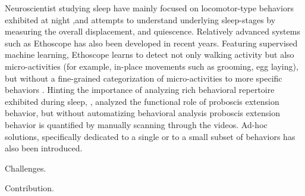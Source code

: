 Neuroscientist studying sleep have mainly focused on locomotor-type behaviors exhibited at night \citep{wiggin_covert_2020, nath_jellyfish_2017},and attempts to understand underlying sleep-stages by measuring the overall displacement, and quiescence.
Relatively advanced systems such as Ethoscope \citep{geissmann_ethoscopes_2017} has also been developed in recent years.
Featuring supervised machine learning, Ethoscope learns to detect not only walking activity but also micro-activities (for example, in-place movements such as grooming, egg laying), but without a fine-grained categorization of micro-activities to more specific behaviors \citep{geissmann_most_2019}.
Hinting the importance of analyzing rich behavioral repertoire exhibited during sleep, \citet{van_alphen_deep_2021}, analyzed the functional role of proboscis extension behavior, but without automatizing behavioral analysis proboscis extension behavior is quantified by manually scanning through the videos.
Ad-hoc solutions, specifically dedicated to a single or to a small subset of behaviors has also been introduced.

Challenges.

Contribution.

